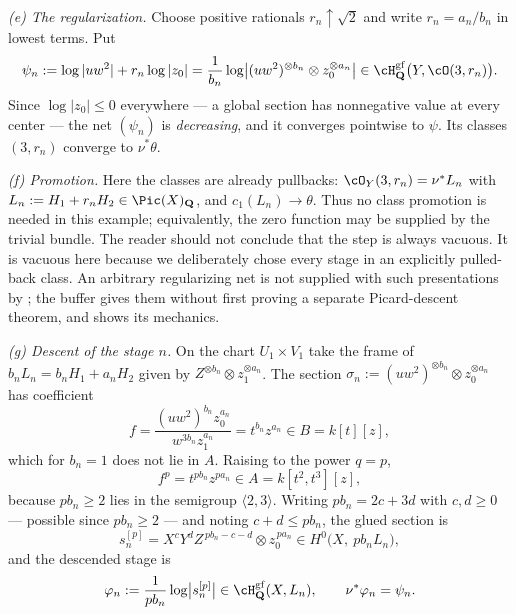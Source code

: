 \begin{example}
\emph{(e) The regularization.}  Choose positive rationals $r_n\uparrow\sqrt2$ and
write $r_n=a_n/b_n$ in lowest terms.  Put
\[
 \psi_n:=\log|uw^2|+r_n\log|z_0|
 =\frac1{b_n}\log\bigl|(uw^2)^{\otimes b_n}\otimes z_0^{\otimes a_n}\bigr|
 \in\cH^{\mathrm{gf}}_{\mathbf Q}\bigl(Y,\cO(3,r_n)\bigr).
\]
Since $\log|z_0|\le0$ everywhere --- a global section has nonnegative
value at every center --- the net $(\psi_n)$ is \emph{decreasing}, and it
converges pointwise to $\psi$.  Its classes $(3,r_n)$ converge to
$\nu^*\theta$.

\emph{(f) Promotion.}  Here the classes are already pullbacks:
$\cO_Y(3,r_n)=\nu^*L_n$ with $L_n:=H_1+r_nH_2\in\Pic(X)_{\mathbf Q}$, and
$c_1(L_n)\to\theta$.  Thus no class promotion is needed in this example;
equivalently, the zero function may be supplied by the trivial bundle.  The
reader should not conclude that the step is always vacuous.  It is vacuous
here because we deliberately chose every stage in an explicitly pulled-back
class.  An arbitrary regularizing net is not supplied with such
presentations by ; the buffer gives them without first
proving a separate Picard-descent theorem, and
 shows its mechanics.

\emph{(g) Descent of the stage $n$.}  On the chart $U_1\times V_1$ take
the frame of $b_nL_n=b_nH_1+a_nH_2$ given by $Z^{\otimes b_n}\otimes
z_1^{\otimes a_n}$.  The section
$\sigma_n:=(uw^2)^{\otimes b_n}\otimes z_0^{\otimes a_n}$ has coefficient
\[
 f=\frac{(uw^2)^{b_n}z_0^{a_n}}{w^{3b_n}z_1^{a_n}}
  =t^{b_n}z^{a_n}\in B=k[t][z],
\]
which for $b_n=1$ does not lie in $A$.  Raising to the power $q=p$,
\[
 f^p=t^{pb_n}z^{pa_n}\in A=k[t^2,t^3][z],
\]
because $pb_n\ge2$ lies in the semigroup $\langle2,3\rangle$.  Writing
$pb_n=2c+3d$ with $c,d\ge0$ --- possible since $pb_n\ge2$ --- and
noting $c+d\le pb_n$, the glued section is
\[
 s_n^{[p]}
 =X^{c}Y^{d}Z^{\,pb_n-c-d}\otimes z_0^{\,pa_n}
 \in H^0\bigl(X,\ pb_nL_n\bigr),
\]
and the descended stage is
\[
 \varphi_n:=\frac1{pb_n}\log\bigl|s_n^{[p]}\bigr|
 \in\cH^{\mathrm{gf}}_{\mathbf Q}(X,L_n),
 \qquad
 \nu^*\varphi_n=\psi_n .
\]


\end{example}
